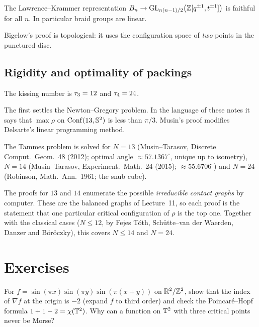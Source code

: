 \begin{theorem}\label{TOP:thm:linear}
The Lawrence--Krammer representation $B_n\to\mathrm{GL}_{n(n-1)/2}\big(\mathbb{Z}[q^{\pm1},t^{\pm1}]\big)$ is faithful for all
$n$. In particular braid groups are linear.
\end{theorem}
\noindent Bigelow's proof is topological: it uses the configuration space of \emph{two} points in the punctured disc.

\subsection*{Rigidity and optimality of packings}

\begin{theorem}
The kissing number is $\tau_3=12$ and $\tau_4=24$.
\end{theorem}
\noindent The first settles the Newton--Gregory problem. In the language of these notes it says that
$\max\rho$ on $\operatorname{Conf}(13,\mathbb{S}^2)$ is less than $\pi/3$. Musin's proof modifies Delsarte's linear programming method.

\begin{theorem}
The Tammes problem is solved for $N=13$ (Musin--Tarasov, Discrete Comput.\ Geom.\ 48 (2012); optimal angle
$\approx57.1367^\circ$, unique up to isometry), $N=14$ (Musin--Tarasov, Experiment.\ Math.\ 24 (2015);
$\approx55.6706^\circ$) and $N=24$ (Robinson, Math.\ Ann.\ 1961; the snub cube).
\end{theorem}
\noindent The proofs for $13$ and $14$ enumerate the possible \emph{irreducible contact graphs} by computer.
These are the balanced graphs of Lecture~11, so each proof is the statement that one particular
critical configuration of $\rho$ is the top one. Together with the classical cases ($N\le12$, by Fejes
T\'oth, Sch\"utte--van der Waerden, Danzer and B\"or\"oczky), this covers $N\le14$ and $N=24$.

\section*{Exercises}

\begin{exercise}
For $f=\sin(\pi x)\sin(\pi y)\sin(\pi(x+y))$ on $\mathbb{R}^2/\mathbb{Z}^2$, show that the index of $\nabla f$ at the origin
is $-2$ (expand $f$ to third order) and check the Poincar\'e--Hopf formula $1+1-2=\chi(\mathbb{T}^2)$. Why can a
function on $\mathbb{T}^2$ with three critical points never be Morse?
\end{exercise}

